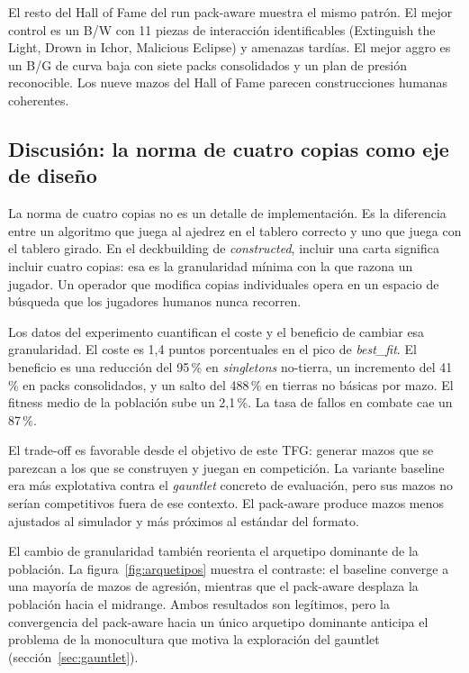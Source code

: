 El resto del Hall of Fame del run pack-aware muestra el mismo patrón. El mejor control es un B/W con 11 piezas de interacción identificables (Extinguish the Light, Drown in Ichor, Malicious Eclipse) y amenazas tardías. El mejor aggro es un B/G de curva baja con siete packs consolidados y un plan de presión reconocible. Los nueve mazos del Hall of Fame parecen construcciones humanas coherentes.

\subsection{Discusión: la norma de cuatro copias como eje de diseño}

La norma de cuatro copias no es un detalle de implementación. Es la diferencia entre un algoritmo que juega al ajedrez en el tablero correcto y uno que juega con el tablero girado. En el deckbuilding de \emph{constructed}, incluir una carta significa incluir cuatro copias: esa es la granularidad mínima con la que razona un jugador. Un operador que modifica copias individuales opera en un espacio de búsqueda que los jugadores humanos nunca recorren.

Los datos del experimento cuantifican el coste y el beneficio de cambiar esa granularidad. El coste es 1,4 puntos porcentuales en el pico de \emph{best\_fit}. El beneficio es una reducción del 95\,\% en \emph{singletons} no-tierra, un incremento del 41\,\% en packs consolidados, y un salto del 488\,\% en tierras no básicas por mazo. El fitness medio de la población sube un 2,1\,\%. La tasa de fallos en combate cae un 87\,\%.

El trade-off es favorable desde el objetivo de este TFG: generar mazos que se parezcan a los que se construyen y juegan en competición. La variante baseline era más explotativa contra el \emph{gauntlet} concreto de evaluación, pero sus mazos no serían competitivos fuera de ese contexto. El pack-aware produce mazos menos ajustados al simulador y más próximos al estándar del formato.

El cambio de granularidad también reorienta el arquetipo dominante de la población. La figura~\ref{fig:arquetipos} muestra el contraste: el baseline converge a una mayoría de mazos de agresión, mientras que el pack-aware desplaza la población hacia el midrange. Ambos resultados son legítimos, pero la convergencia del pack-aware hacia un único arquetipo dominante anticipa el problema de la monocultura que motiva la exploración del gauntlet (sección~\ref{sec:gauntlet}).

